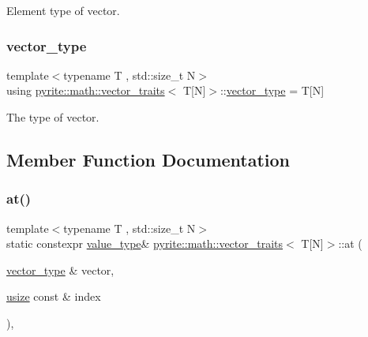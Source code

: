 Element type of vector. \mbox{\label{structpyrite_1_1math_1_1vector__traits_3_01_t[_n]_4_a092357eae264b1a7aaf1a6e66e41fb52}} 
\subsubsection{\texorpdfstring{vector\+\_\+type}{vector\_type}}
{\footnotesize\ttfamily template$<$typename T , std\+::size\+\_\+t N$>$ \\
using \mbox{\hyperlink{structpyrite_1_1math_1_1vector__traits}{pyrite\+::math\+::vector\+\_\+traits}}$<$ T\mbox{[}N\mbox{]}$>$\+::\mbox{\hyperlink{structpyrite_1_1math_1_1vector__traits_3_01_t[_n]_4_a092357eae264b1a7aaf1a6e66e41fb52}{vector\+\_\+type}} =  T\mbox{[}N\mbox{]}}

The type of vector. 

\subsection{Member Function Documentation}
\mbox{\label{structpyrite_1_1math_1_1vector__traits_3_01_t[_n]_4_a348aa9a8c63771e16d5e7637839f5b18}} 
\subsubsection{\texorpdfstring{at()}{at()}\hspace{0.1cm}{\footnotesize\ttfamily [1/2]}}
{\footnotesize\ttfamily template$<$typename T , std\+::size\+\_\+t N$>$ \\
static constexpr \mbox{\hyperlink{structpyrite_1_1math_1_1vector__traits_3_01_t[_n]_4_ab6b98499d39e4fb65ea3addf98fd7960}{value\+\_\+type}}\& \mbox{\hyperlink{structpyrite_1_1math_1_1vector__traits}{pyrite\+::math\+::vector\+\_\+traits}}$<$ T\mbox{[}N\mbox{]}$>$\+::at (\begin{DoxyParamCaption}\item[{\mbox{\hyperlink{structpyrite_1_1math_1_1vector__traits_3_01_t[_n]_4_a092357eae264b1a7aaf1a6e66e41fb52}{vector\+\_\+type}} \&}]{vector,  }\item[{\mbox{\hyperlink{type_8hpp_a3984e6dc0a53b867e054e8447f2f2be1}{usize}} const \&}]{index }\end{DoxyParamCaption})\hspace{0.3cm}{\ttfamily [inline]}, {\ttfamily [static]}}

